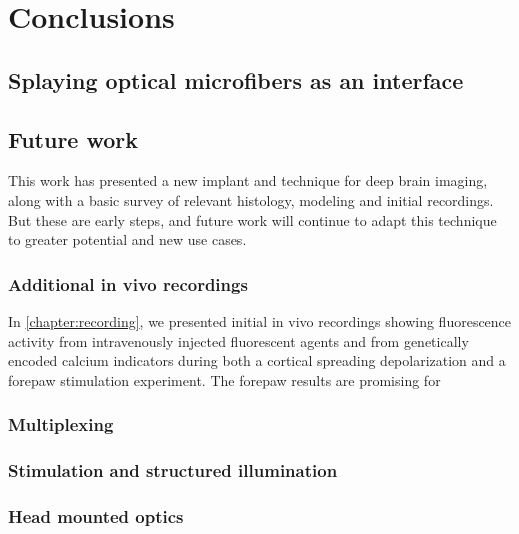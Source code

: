 \chapter{Conclusions}
\label{chapter:Conclusions}

\thispagestyle{myheadings}

\graphicspath{{7_Conclusion/Figures/}}

\section{Splaying optical microfibers as an interface}

\section{Future work}

This work has presented a new implant and technique
for deep brain imaging, along with a basic survey of 
relevant histology, modeling and initial recordings. 
But these are early steps, and future work will 
continue to adapt this technique to greater potential 
and new use cases.

\subsection{Additional in vivo recordings}

In \cref{chapter:recording}, we presented initial 
in vivo recordings showing fluorescence activity 
from intravenously injected fluorescent agents and 
from genetically encoded calcium indicators during 
both a cortical spreading depolarization and a 
forepaw stimulation experiment. The forepaw results 
are promising for 

\subsection{Multiplexing}



\subsection{Stimulation and structured illumination}



\subsection{Head mounted optics}


